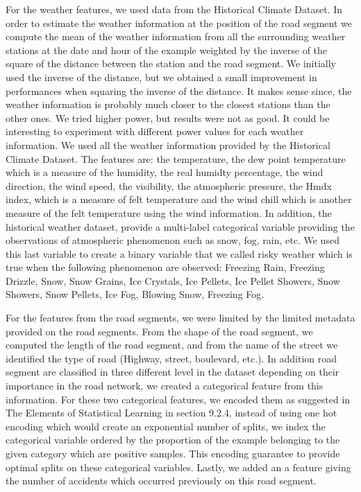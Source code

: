 \documentclass[conference]{IEEEtran}
\begin{document}
For the weather features, we used data from the Historical Climate Dataset. In order to estimate the weather information at the position of the road segment we compute the mean of the weather information from all  the surrounding weather stations at the date and hour of the example  weighted by the inverse of the square of the distance between the station and the road segment. We initially used the inverse of the distance, but we obtained a small improvement in performances when squaring the inverse of the distance. It makes sense since, the weather information is probably much closer to the closest stations than the other ones. We tried higher power, but results were not as good. It could be interesting to experiment with different power values for each weather information. We used all the weather information provided by the Historical Climate Dataset. The features are: the temperature, the dew point temperature which is a measure of the humidity, the real humidty percentage, the wind direction, the wind speed, the visibility, the atmospheric pressure, the Hmdx index, which is a measure of felt temperature and the wind chill which is another measure of the felt temperature using the wind information. In addition, the historical weather dataset, provide a multi-label categorical variable providing the observations of atmospheric phenomenon such as snow, fog, rain, etc. We used this last variable to create a binary variable that we called risky weather which is true when the following phenomenon are observed: Freezing Rain, Freezing Drizzle, Snow, Snow Grains, Ice Crystals, Ice Pellets, Ice Pellet Showers, Snow Showers, Snow Pellets, Ice Fog, Blowing Snow, Freezing Fog.

For the features from the road segments, we were limited by the limited metadata provided on the road segments. From the shape of the road segment, we computed the length of the road segment, and from the name of the street we identified the type of road (Highway, street, boulevard, etc.). In addition road segment are classified in three different level in the dataset depending on their importance in the road network, we created a categorical feature from this information. For these two categorical features, we encoded them as suggested in The Elements of Statistical Learning\cite{elementsofstat} in section 9.2.4, instead of using one hot encoding which would create an exponential number of splits, we index the categorical variable ordered by the proportion of the example belonging to the given category which are positive samples. This encoding guarantee to provide optimal splits on these categorical variables. Lastly, we added an a feature giving the number of accidents which occurred previously on this road segment.
\end{document}
